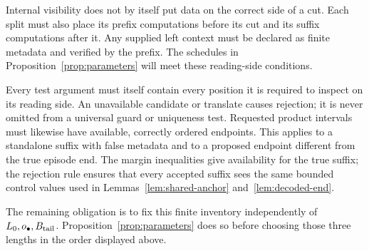 Internal visibility does not by itself put data on the correct side of
a cut. Each split must also place its prefix computations before its cut
and its suffix computations after it. Any supplied left context must be
declared as finite metadata and verified by the prefix. The schedules in
Proposition~\ref{prop:parameters} will meet these reading-side conditions.

Every test argument must itself contain every position it is required
to inspect on its reading side. An unavailable candidate or translate
causes rejection; it is never omitted from a universal guard or uniqueness
test. Requested product intervals must likewise have available, correctly
ordered endpoints. This applies to a standalone suffix with false metadata
and to a proposed endpoint different from the true episode end. The margin
inequalities give availability for the true suffix; the rejection rule
ensures that every accepted suffix sees the same bounded control values
used in Lemmas~\ref{lem:shared-anchor} and~\ref{lem:decoded-end}.

The remaining obligation is to fix this finite inventory independently of
$L_0,o_\bullet,B_{\rm tail}$. Proposition~\ref{prop:parameters} does so
before choosing those three lengths in the order displayed above.
